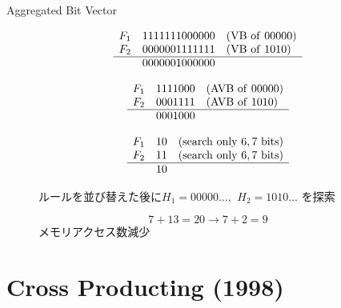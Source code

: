 \documentclass[12pt,dvipdfmx,mathserif,uplatex,aspectratio=32]{beamer}
\begin{document}
\begin{frame}{Aggregated Bit Vector}
\begin{figure}[h]
 \def\@captype{table}
 \begin{minipage}[c]{.5\textwidth}
   \begin{equation*}
    \begin{array}{lll}
     F_{1} & 1111111000000 & ({\rm VB \ of \ } 00000) \\
     F_{2} & 0000001111111 & ({\rm VB \ of \ } 1010) \\ \hline
           & 0000001000000 &
    \end{array}
   \end{equation*}

   \begin{equation*}
    \begin{array}{lll}
     F_{1} & 1111000 & ({\rm AVB \ of \ } 00000) \\
     F_{2} & 0001111 & ({\rm AVB \ of \ } 1010) \\ \hline
           & 0001000 & 
    \end{array}
   \end{equation*}

   \begin{equation*}
    \begin{array}{lll}
     F_{1} & 10 & ({\rm search \ only } \ 6,7 \ {\rm bits}) \\
     F_{2} & 11 & ({\rm search \ only } \ 6,7 \ {\rm bits}) \\ \hline
           & 10 & 
    \end{array}
   \end{equation*}

  \end{minipage}
  \hfill
  \begin{minipage}[c]{.43\textwidth}
  
  \vspace{3mm}
  ルールを並び替えた後に$H_{1} = 00000 \dots$, $\ H_{2} = 1010 \dots $ を探索

  \[
   7 + 13 = 20 \to 7 + 2 = 9
  \]
  メモリアクセス数減少
  \end{minipage}
\end{figure}

\end{frame}


\section{Cross Producting (1998)}
\end{document}
